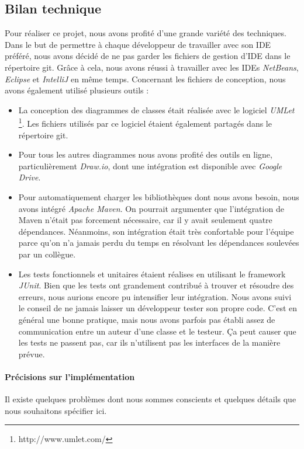 \documentclass[10pt,a4paper]{book}
\begin{document}
\subsection{Bilan technique}
Pour réaliser ce projet, nous avons profité d'une grande variété des techniques. Dans le but de permettre à chaque développeur de travailler avec son IDE préféré, nous avons décidé de ne pas garder les fichiers de gestion d'IDE dans le répertoire git. Grâce à cela, nous avons réussi à travailler avec les IDEs \textit{NetBeans}, \textit{Eclipse} et \textit{IntelliJ} en même temps. Concernant les fichiers de conception, nous avons également utilisé plusieurs outils :
\begin{itemize}
	\item{La conception des diagrammes de classes était réalisée avec le logiciel \textit{UMLet} \footnote{http://www.umlet.com/}. Les fichiers utilisés par ce logiciel étaient également partagés dans le répertoire git.}
	\item{Pour tous les autres diagrammes nous avons profité des outils en ligne, particulièrement \textit{Draw.io}, dont une intégration est disponible avec \textit{Google Drive}.}
	\item{Pour automatiquement charger les bibliothèques dont nous avons besoin, nous avons intégré \textit{Apache Maven}. On pourrait argumenter que l'intégration de Maven n'était pas forcement nécessaire, car il y avait seulement quatre dépendances. Néanmoins, son intégration était très confortable pour l'équipe parce qu'on n'a jamais perdu du temps en résolvant les dépendances soulevées par un collègue.}
	\item{Les tests fonctionnels et unitaires étaient réalises en utilisant le framework \textit{JUnit}. Bien que les tests ont grandement contribué à trouver et résoudre des erreurs, nous aurions encore pu intensifier leur intégration. Nous avons suivi le conseil de ne jamais laisser un développeur tester son propre code. C'est en général une bonne pratique, mais nous avons parfois pas établi assez de communication entre un auteur d'une classe et le testeur. Ça peut causer que les tests ne passent pas, car ils n'utilisent pas les interfaces de la manière prévue.}
\end{itemize}
\paragraph{Précisions sur l'implémentation}
Il existe quelques problèmes dont nous sommes conscients et quelques détails que nous souhaitons spécifier ici.
\end{document}
